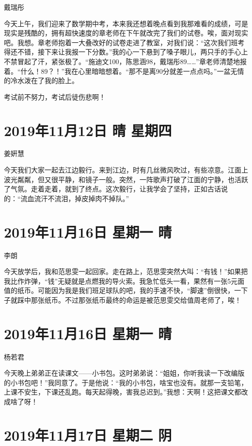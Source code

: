 戴瑞彤

今天上午，我们迎来了数学期中考，本来我还想着晚点看到我那难看的成绩，可是现实是残酷的，拥有超快速度的章老师在下午就改完了我们的试卷。唉，面对现实吧。我想。章老师抱着一大叠改好的试卷走进了教室，对我们说：``这次我们班考得还不错，接下来让我报一下分数。''我的心一下悬到了嗓子眼儿，两只手的手心上不禁冒起了汗，紧张极了。``施迪文100，陈思涵98，戴瑞彤89\ldots\ldots{}''章老师清楚地报着。``什么！89？！''我在心里暗暗想着。``那不是离90分就差一点点吗。''一盆无情的冷水泼在了我的脸上。

考试前不努力，考试后徒伤悲啊！

\section{2019年11月12日 晴 星期四}

姜姸慧

今天我们大家一起去江边毅行。来到江边，时有几丝微风吹过，有些凉意。江面上波光粼粼，但又很平静，和镜子一般。突然，一阵歌声打破了江面的宁静，也活跃了气氛。走着走着，就到了终点。这次毅行，让我学会了坚持，正如古话说的：``流血流汗不流泪，掉皮掉肉不掉队。''

\section{2019年11月16日 星期一 晴}

李朗

今天放学后，我和范思雯一起回家。走在路上，范思雯突然大叫：``有钱！''如果把我比作炸弹，``钱''无疑就是点燃我的导火索。我急忙低头一看，果然有一张5元面值的纸币。可能因为我是我们班足球队的吧，我的手速不快，``脚速''倒很快，一下子就踩中那张纸币。不过那张纸币最终的命运是被范思雯交给值周老师了，唉！

\section{2019年11月16日 星期一 晴}

杨若君

今天晚上弟弟正在读课文------小书包。这时弟弟说：``姐姐，你听我读一下改编版的小书包吧！''我同意了。于是他说：``我的小书包，啥宝也没有。就那一支铅笔，上课不安生，下课还乱跑。每天起得晚，害我总迟到。''我想：天啊！这把课文都改成啥了呀！

\section{2019年11月17日 星期二 阴}

